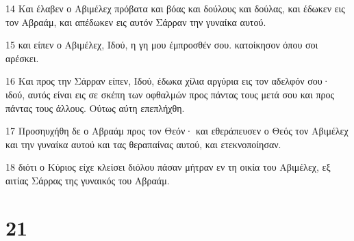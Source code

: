 \par 14 Και έλαβεν ο Αβιμέλεχ πρόβατα και βόας και δούλους και δούλας, και έδωκεν εις τον Αβραάμ, και απέδωκεν εις αυτόν Σάρραν την γυναίκα αυτού.
\par 15 και είπεν ο Αβιμέλεχ, Ιδού, η γη μου έμπροσθέν σου. κατοίκησον όπου σοι αρέσκει.
\par 16 Και προς την Σάρραν είπεν, Ιδού, έδωκα χίλια αργύρια εις τον αδελφόν σου· ιδού, αυτός είναι εις σε σκέπη των οφθαλμών προς πάντας τους μετά σου και προς πάντας τους άλλους. Ούτως αύτη επεπλήχθη.
\par 17 Προσηυχήθη δε ο Αβραάμ προς τον Θεόν· και εθεράπευσεν ο Θεός τον Αβιμέλεχ και την γυναίκα αυτού και τας θεραπαίνας αυτού, και ετεκνοποίησαν.
\par 18 διότι ο Κύριος είχε κλείσει διόλου πάσαν μήτραν εν τη οικία του Αβιμέλεχ, εξ αιτίας Σάρρας της γυναικός του Αβραάμ.

\chapter{21}

